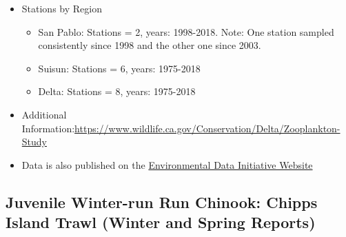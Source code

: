 \documentclass[
]{book}
\providecommand{\tightlist}{%
  \setlength{\itemsep}{0pt}\setlength{\parskip}{0pt}}
\begin{document}
\begin{itemize}
  \begin{itemize}
  \tightlist
  \item
    Stations by Region

    \begin{itemize}
    \tightlist
    \item
      San Pablo: Stations = 2, years: 1998-2018. Note: One station sampled consistently since 1998 and the other one since 2003.
    \item
      Suisun: Stations = 6, years: 1975-2018
    \item
      Delta: Stations = 8, years: 1975-2018
    \end{itemize}
  \item
    Additional Information:\url{https://www.wildlife.ca.gov/Conservation/Delta/Zooplankton-Study}
  \item
    Data is also published on the \href{https://portal.edirepository.org/nis/mapbrowse?packageid=edi.522.2}{Environmental Data Initiative Website}
  \end{itemize}
\end{itemize}

\hypertarget{juvenile-winter-run-run-chinook-chipps-island-trawl-winter-and-spring-reports}{%
\subsection{Juvenile Winter-run Run Chinook: Chipps Island Trawl (Winter and Spring Reports)}\label{juvenile-winter-run-run-chinook-chipps-island-trawl-winter-and-spring-reports}}
\end{document}
